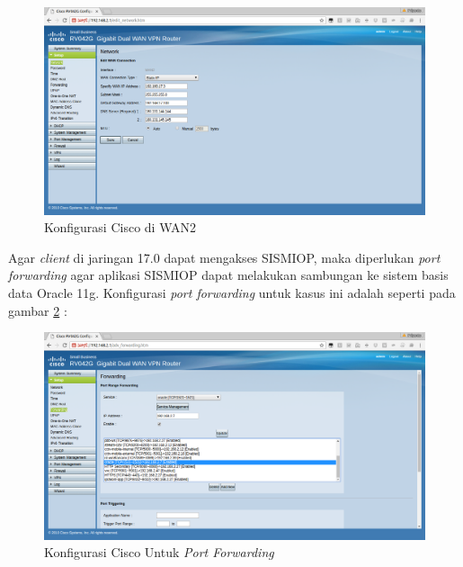 \documentclass[pdftex,12pt, oneside]{article}
\begin{document}
\begin{figure}[H]
  \centering
  \includegraphics[width=1\textwidth]{./resources/konfig-cisco}
  \caption{Konfigurasi Cisco di WAN2}
  \label{fig:konfig-cisco}
\end{figure}

Agar \textit{client} di jaringan 17.0 dapat mengakses SISMIOP, maka diperlukan \textit{port forwarding} agar aplikasi SISMIOP dapat melakukan sambungan ke sistem basis data Oracle 11g. Konfigurasi \textit{port forwarding} untuk kasus ini adalah seperti pada gambar \ref{fig:port-forward-cisco} :

\begin{figure}[H]
  \centering
  \includegraphics[width=1\textwidth]{./resources/port-forward-cisco}
  \caption{Konfigurasi Cisco Untuk \textit{Port Forwarding}}
  \label{fig:port-forward-cisco}
\end{figure}
\end{document}
